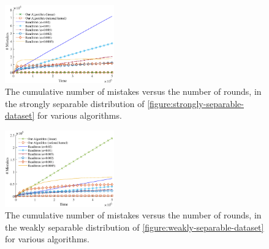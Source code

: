 
\begin{figure}
\centering
\includegraphics[width=0.42\textwidth]{figures/strong3}
\caption{The cumulative number of mistakes versus the number of rounds,
in the strongly separable distribution of \autoref{figure:strongly-separable-dataset} for various algorithms.}
\label{figure:number-of-mistakes-strongly-separable-dataset}
\end{figure}

\begin{figure}
\centering
\includegraphics[width=0.42\textwidth]{figures/weak3}
\caption{The cumulative number of mistakes versus the number of rounds,
in the weakly separable distribution of \autoref{figure:weakly-separable-dataset} for various algorithms.}
\label{figure:number-of-mistakes-weakly-separable-dataset}
\end{figure}
